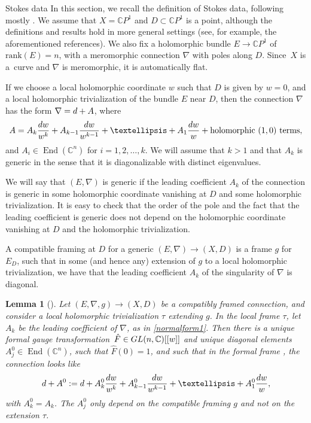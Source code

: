 \documentclass[11pt]{article}
\numberwithin{equation}{section}
\newtheorem{Lemma}[Theorem]{Lemma}
\numberwithin{equation}{section}
\newcommand{\CP}{\mathbb{C}P^1}
\begin{document}
\begin{subsubsection}{Stokes data}\label{GMD}
In this section, we recall the definition of Stokes data, following mostly \cite{Bir, B, B2, Wasow,Wit}. We assume that $X=\CP$ and $D\subset \CP$ is a point, although the definitions and results hold in more general settings (see, for example, the aforementioned references). We also fix a holomorphic bundle $E\to \CP$ of $\text{rank}(E)=n$, with a meromorphic connection $\nabla$ with poles along $D$. Since~$X$ is a~curve and $\nabla$ is meromorphic, it is automatically flat.

If we choose a local holomorphic coordinate $w$ such that $D$ is given by $w=0$, and a local holomorphic trivialization of the bundle $E$ near $D$, then the connection $\nabla$ has the form $\nabla={\rm d}+A$, where
\begin{equation} \label{normalform1}
 A=A_k\frac{{\rm d}w}{w^k}+A_{k-1}\frac{{\rm d}w}{w^{k-1}}+ \dots +A_1\frac{{\rm d}w}{w} + \text{holomorphic $(1,0)$ terms},
\end{equation}
and $A_i\in \operatorname{End}(\mathbb{C}^{n})$ for $i=1,2,\dots ,k$. We will assume that $k>1$ and that $A_k$ is generic in the sense that it is diagonalizable with distinct eigenvalues.

We will say that $(E,\nabla)$ is generic if the leading coefficient $A_k$ of the connection is generic in some holomorphic coordinate vanishing at $D$ and some holomorphic trivialization. It is easy to check that the order of the pole and the fact that the leading coefficient is generic does not depend on the holomorphic coordinate vanishing at $D$ and the holomorphic trivialization.

\begin{Definition}
A compatible framing at $D$ for a generic $(E,\nabla)\to (X,D)$ is a frame $g$ for~$E_{D}$, such that in some (and hence any) extension of $g$ to a local holomorphic trivialization, we have that the leading coefficient $A_k$ of the singularity of $\nabla$ is diagonal.
\end{Definition}

\begin{Lemma}[{\cite[Lemma 1]{B2}}] \label{FGT}
Let $(E,\nabla,g)\to (X,D)$ be a compatibly framed connection, and consider a local holomorphic trivialization $\tau$ extending $g$. In the local frame $\tau$, let $A_k$ be the leading coefficient of $\nabla$, as in \eqref{normalform1}. Then there is a unique formal gauge transformation~${\hat{F}\in {\rm GL}(n,\mathbb{C})[[w]]}$ and unique diagonal elements $A^0_j\in \operatorname{End}(\mathbb{C}^n)$, such that $\hat{F}(0)=1$, and such that in the formal frame , the connection looks like
\begin{equation*}
 {\rm d}+A^0:={\rm d}+A_{k}^0\frac{{\rm d}w}{w^k}+A_{k-1}^0\frac{{\rm d}w}{w^{k-1}}+ \dots +A_1^0\frac{{\rm d}w}{w},
\end{equation*}
with $A_k^0=A_k$. The $A^0_j$ only depend on the compatible framing $g$ and not on the extension $\tau$.
\end{Lemma}


\end{subsubsection}
\end{document}
